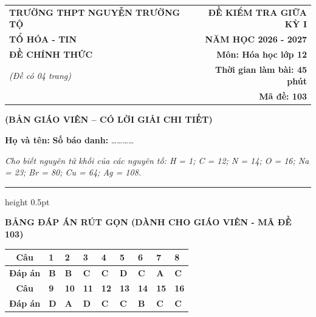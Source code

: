 \documentclass[11pt,a4paper]{article}
\begin{document}
\noindent
\begin{tabularx}{\textwidth}{@{}X r@{}}
\textbf{TRƯỜNG THPT NGUYỄN TRƯỜNG TỘ} & \textbf{ĐỀ KIỂM TRA GIỮA KỲ I} \\
\textbf{TỔ HÓA - TIN} & \textbf{NĂM HỌC 2026 - 2027} \\
\textbf{ĐỀ CHÍNH THỨC} & \textbf{Môn: Hóa học lớp 12} \\
\textit{(Đề có 04 trang)} & \textbf{Thời gian làm bài: 45 phút} \\
& \textbf{Mã đề: 103}
\end{tabularx}

\begin{center}
{\color{hfRed}\textbf{\large (BẢN GIÁO VIÊN -- CÓ LỜI GIẢI CHI TIẾT)}}
\end{center}

\vspace{2pt}
\noindent\textbf{Họ và tên:} \dotfill \textbf{Số báo danh:} \dots\dots\dots\dots

\vspace{2pt}
\noindent\textit{Cho biết nguyên tử khối của các nguyên tố: H = 1; C = 12; N = 14; O = 16; Na = 23; Br = 80; Cu = 64; Ag = 108.}
\vspace{2pt}
\hrule height 0.5pt
\vspace{6pt}

\begin{center}
{\color{hfRed}\textbf{\large BẢNG ĐÁP ÁN RÚT GỌN (DÀNH CHO GIÁO VIÊN - MÃ ĐỀ 103)}}
\end{center}

\begin{center}
\renewcommand{\arraystretch}{1.2}
\begin{tabular}{|c|*{8}{>{\centering\arraybackslash}m{0.95cm}|}}
\hline
\rowcolor{tableGreen}
\textbf{Câu} & \textbf{1} & \textbf{2} & \textbf{3} & \textbf{4} & \textbf{5} & \textbf{6} & \textbf{7} & \textbf{8} \\
\hline
\textbf{Đáp án} & \textbf{\color{hfRed}B} & \textbf{\color{hfRed}B} & \textbf{\color{hfRed}C} & \textbf{\color{hfRed}C} & \textbf{\color{hfRed}D} & \textbf{\color{hfRed}C} & \textbf{\color{hfRed}A} & \textbf{\color{hfRed}C} \\
\hline
\hline
\rowcolor{tableGreen}
\textbf{Câu} & \textbf{9} & \textbf{10} & \textbf{11} & \textbf{12} & \textbf{13} & \textbf{14} & \textbf{15} & \textbf{16} \\
\hline
\textbf{Đáp án} & \textbf{\color{hfRed}D} & \textbf{\color{hfRed}A} & \textbf{\color{hfRed}D} & \textbf{\color{hfRed}C} & \textbf{\color{hfRed}C} & \textbf{\color{hfRed}B} & \textbf{\color{hfRed}C} & \textbf{\color{hfRed}C} \\
\hline
\end{tabular}
\end{center}
\end{document}
